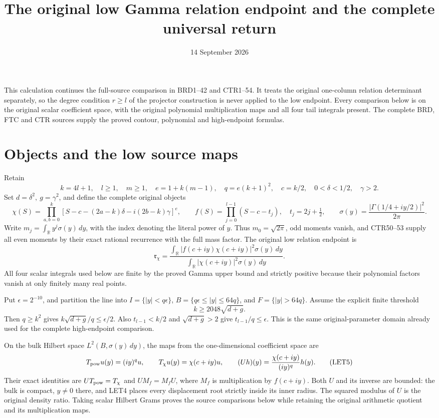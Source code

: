 \documentclass[11pt]{article}
\title{The original low Gamma relation endpoint and the complete universal return}
\author{}
\date{14 September 2026}
\begin{document}
\maketitle

This calculation continues the full-source comparison in BRD1--42 and
CTR1--54. It treats the original one-column relation determinant separately,
so the degree condition \(r\ge l\) of the projector construction is never
applied to the low endpoint. Every comparison below is on the original
scalar coefficient space, with the original polynomial multiplication
maps and all four tail integrals present. The complete BRD, FTC and CTR
sources supply the proved contour, polynomial and high-endpoint formulas.

\section{Objects and the low source maps}
Retain
\[
 k=4l+1,\quad l\ge1,\quad m\ge1,\quad e=1+k(m-1),\quad
 q=e(k+1)^2,\quad c=k/2,\quad 0<\delta<1/2,\quad\gamma>2.
 \tag{LET1}
\]
Set \(d=\delta^2,\ g=\gamma^2\), and define the complete original objects
\[
 \chi(S)=\prod_{a,b=0}^k
 [S-c-(2a-k)\delta-i(2b-k)\gamma]^e,\qquad
 f(S)=\prod_{j=0}^{l-1}(S-c-t_j),\quad t_j=2j+\tfrac12,
 \qquad \sigma(y)=\frac{|\Gamma(1/4+iy/2)|^2}{2\pi}.
 \tag{LET2}
\]
Write \(m_j=\int_{\mathbb R}y^j\sigma(y)\,dy\), with the index denoting the
literal power of \(y\). Thus \(m_0=\sqrt{2\pi}\), odd moments vanish, and
CTR50--53 supply all even moments by their exact rational recurrence with
the full mass factor. The original low relation endpoint is
\[
 \mathfrak r_\chi=
 \frac{\int_{\mathbb R}|f(c+iy)\chi(c+iy)|^2\sigma(y)\,dy}
      {\int_{\mathbb R}|\chi(c+iy)|^2\sigma(y)\,dy}.
 \tag{LET3}
\]
All four scalar integrals used below are finite by the proved Gamma upper
bound and strictly positive because their polynomial factors vanish at
only finitely many real points.

Put \(\epsilon=2^{-10}\), and partition the line into
\(I=\{|y|<q\epsilon\}\), \(B=\{q\epsilon\le |y|\le64q\}\), and
\(F=\{|y|>64q\}\). Assume the explicit finite threshold
\[
 k\ge2048\sqrt{d+g}.
 \tag{LET4}
\]
Then \(q\ge k^2\) gives \(k\sqrt{d+g}/q\le\epsilon/2\).
Also \(t_{l-1}<k/2\) and \(\sqrt{d+g}>2\) give
\(t_{l-1}/q\le\epsilon\). This is the same original-parameter domain
already used for the complete high-endpoint comparison.

On the bulk Hilbert space \(L^2(B,\sigma(y)\,dy)\), the maps from the
one-dimensional coefficient space are
\[
 T_{\rm pow}u(y)=(iy)^q u,\qquad
 T_\chi u(y)=\chi(c+iy)u,\qquad
 (Uh)(y)=\frac{\chi(c+iy)}{(iy)^q}h(y).
 \tag{LET5}
\]
Their exact identities are \(UT_{\rm pow}=T_\chi\) and
\(UM_f=M_fU\), where \(M_f\) is multiplication by \(f(c+iy)\).
Both \(U\) and its inverse are bounded: the bulk is compact, \(y\ne0\)
there, and LET4 places every displacement root strictly inside its inner
radius. The squared modulus of \(U\) is the original density ratio.
Taking scalar Hilbert Grams proves the source comparisons below while
retaining the original arithmetic quotient and its multiplication maps.
\end{document}
